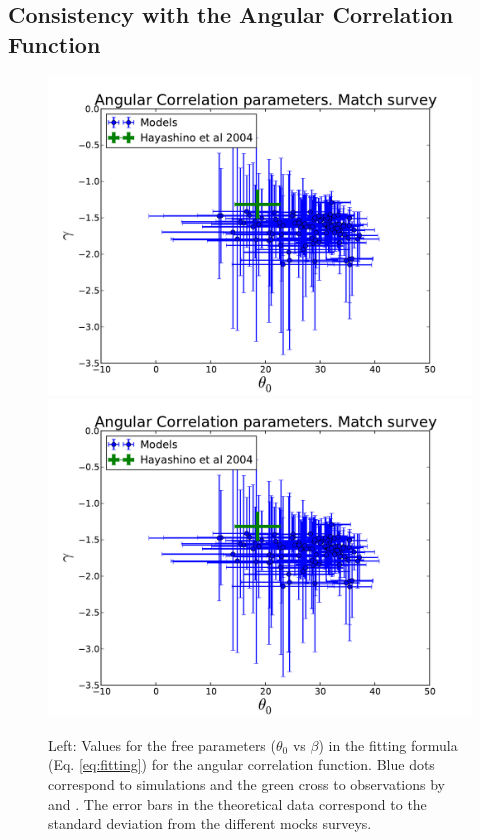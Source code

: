 \documentclass[usenatbib]{mn2e}
\begin{document}
\subsection{Consistency with the Angular Correlation Function}



\begin{figure}
\begin{center}
\includegraphics[width=0.46\linewidth,angle=0]{./plots/power_law_correlation.pdf} 
\hspace{5mm}  
\includegraphics[width=0.46\linewidth,angle=0]{./plots/power_law_correlation.pdf} 
\end{center}
\caption{Left: Values for the free parameters ($\theta_{0}$ vs $\beta$) 
in the fitting formula (Eq. \ref{eq:fitting}) for the angular
correlation function. Blue dots correspond to simulations and the
green cross to observations by \citet{Hayashino2004} and
\citet{Ouchi2010}. The error bars in the   theoretical data correspond
to the standard deviation from the different mocks surveys. 
\label{fig:correlation_parameters}}
\end{figure} 
\end{document}
